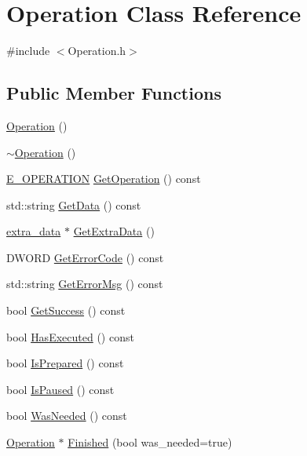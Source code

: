 \section{Operation Class Reference}
\label{class_operation}


{\ttfamily \#include $<$Operation.\-h$>$}

\subsection*{Public Member Functions}
\begin{DoxyCompactItemize}
\item 
\hyperlink{class_operation_a55f76bcb8990f4dba577990af0c8399e}{Operation} ()
\item 
\hyperlink{class_operation_a14089623bd8a73e73375353c3d8a4b6e}{$\sim$\-Operation} ()
\item 
\hyperlink{_operation_8h_a29c331c24eda38b81f1e27a40391a589}{E\-\_\-\-O\-P\-E\-R\-A\-T\-I\-O\-N} \hyperlink{class_operation_ac848512e0fc5b66f1911bf2bfc17b56d}{Get\-Operation} () const 
\item 
std\-::string \hyperlink{class_operation_ace4ea581702ce225b0e2a89608100312}{Get\-Data} () const 
\item 
\hyperlink{structextra__data}{extra\-\_\-data} $\ast$ \hyperlink{class_operation_ae19cf9a5663925c03a897ae6177a43b4}{Get\-Extra\-Data} ()
\item 
D\-W\-O\-R\-D \hyperlink{class_operation_a75e5df9dbc5985f4b82bab9193378e6b}{Get\-Error\-Code} () const 
\item 
std\-::string \hyperlink{class_operation_aef57319b4837807d1d4c30c6ed53f814}{Get\-Error\-Msg} () const 
\item 
bool \hyperlink{class_operation_afca1d8978bb74555f0a6012d0984c90e}{Get\-Success} () const 
\item 
bool \hyperlink{class_operation_afbca526e90ce2af4bbc71817add9867d}{Has\-Executed} () const 
\item 
bool \hyperlink{class_operation_ab956c9ec646f7236607b21208e80a93c}{Is\-Prepared} () const 
\item 
bool \hyperlink{class_operation_abbe71fc5a2f6ef31a8ffd75685c2bc9e}{Is\-Paused} () const 
\item 
bool \hyperlink{class_operation_a0a609b1874688da41197d24ead40b5b6}{Was\-Needed} () const 
\item 
\hyperlink{class_operation}{Operation} $\ast$ \hyperlink{class_operation_a7704d1a6eb8321f2784551bb09f8daff}{Finished} (bool was\-\_\-needed=true)

\end{DoxyCompactItemize}
